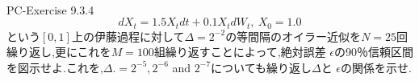 \documentclass[dvipdfmx,cjk]{beamer}
\numberwithin{equation}{section}
\newlength{\cellleftmargin}
\newlength{\smallerfontscale}
\def\smaller{\fontsize{\smallerfontscale}{\smallerfontscale}\selectfont}
\begin{document}
\begin{frame}
\begin{addmargin}[\cellleftmargin]{0em}%
    {\smaller%
    \vspace{-1\smallerfontscale}%
    
    \begin{center}
    \end{center}
    { \hspace*{\fill} \\}
    }%
    \end{addmargin}%
	
\end{frame}

\begin{frame}{PC-Exercise 9.3.4}
\[
dX_t = 1.5 X_t dt + 0.1 X_t dW_t ,\ X_0 =1.0
\]
という$[0,1]$上の伊藤過程に対して$\Delta= 2^{-2}$の等間隔のオイラー近似を$N=25$回繰り返し,更にこれを$M=100$組繰り返すことによって,絶対誤差 $\epsilon$の90％信頼区間を図示せよ.これを,$\Delta . = 2^{-5} , 2^{-6}$ and $2^{-7} $についても繰り返し$\Delta$と $\epsilon$の関係を示せ.
\end{frame}
\end{document}
